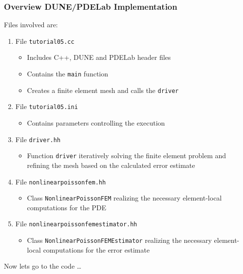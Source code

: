 \documentclass[aspectratio=169,11pt]{beamer}
\theoremstyle{definition}
\begin{document}
\begin{frame}
\frametitle{Overview DUNE/PDELab Implementation}
Files involved are:
\begin{enumerate}[1)]
\item File \lstinline{tutorial05.cc} 
\begin{itemize}
\item Includes C++, DUNE and PDELab header files 
\item Contains the \lstinline{main} function
\item Creates a finite element mesh and calls the \lstinline{driver}
\end{itemize}
\item File \lstinline{tutorial05.ini} 
\begin{itemize}
\item Contains parameters controlling the execution
\end{itemize}
\item File \lstinline{driver.hh}
\begin{itemize}
\item Function \lstinline{driver} iteratively solving the finite element problem
  and refining the mesh based on the calculated error estimate
\end{itemize}
\item File \lstinline{nonlinearpoissonfem.hh} 
\begin{itemize}
\item Class \lstinline{NonlinearPoissonFEM} 
realizing the necessary element-local computations for the PDE
\end{itemize}
\item File \lstinline{nonlinearpoissonfemestimator.hh} 
\begin{itemize}
\item Class \lstinline{NonlinearPoissonFEMEstimator} 
realizing the necessary element-local computations for the error estimate
\end{itemize}
\end{enumerate}
Now lets go to the code \ldots
\end{frame}
\end{document}

